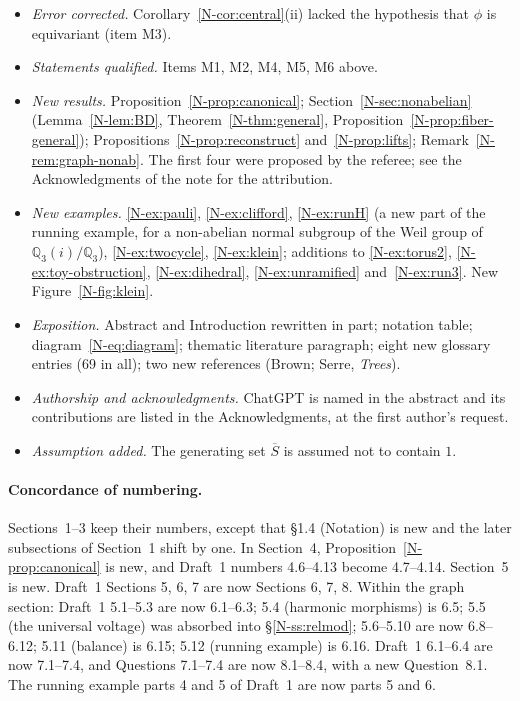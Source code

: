 \documentclass[12pt,letterpaper]{article}
\begin{document}
\begin{itemize}[itemsep=1pt]
\item \emph{Error corrected.} Corollary~\ref{N-cor:central}(ii) lacked
  the hypothesis that $\phi$ is equivariant (item M3).
\item \emph{Statements qualified.} Items M1, M2, M4, M5, M6 above.
\item \emph{New results.} Proposition~\ref{N-prop:canonical};
  Section~\ref{N-sec:nonabelian} (Lemma~\ref{N-lem:BD},
  Theorem~\ref{N-thm:general},
  Proposition~\ref{N-prop:fiber-general});
  Propositions~\ref{N-prop:reconstruct} and~\ref{N-prop:lifts};
  Remark~\ref{N-rem:graph-nonab}. The first four were proposed by the
  referee; see the Acknowledgments of the note for the attribution.
\item \emph{New examples.} \ref{N-ex:pauli}, \ref{N-ex:clifford},
  \ref{N-ex:runH} (a new part of the running example, for a non-abelian
  normal subgroup of the Weil group of $\mathbb{Q}_3(i)/\mathbb{Q}_3$),
  \ref{N-ex:twocycle}, \ref{N-ex:klein}; additions to
  \ref{N-ex:torus2}, \ref{N-ex:toy-obstruction}, \ref{N-ex:dihedral},
  \ref{N-ex:unramified} and~\ref{N-ex:run3}. New Figure~\ref{N-fig:klein}.
\item \emph{Exposition.} Abstract and Introduction rewritten in part;
  notation table; diagram~\eqref{N-eq:diagram}; thematic literature
  paragraph; eight new glossary entries (69 in all); two new references
  (Brown; Serre, \emph{Trees}).
\item \emph{Authorship and acknowledgments.} ChatGPT is named in the
  abstract and its contributions are listed in the Acknowledgments, at the
  first author's request.
\item \emph{Assumption added.} The generating set $\overline{S}$ is
  assumed not to contain $1$.
\end{itemize}

\paragraph{Concordance of numbering.} Sections~1--3 keep their numbers,
except that \S1.4 (Notation) is new and the later subsections of
Section~1 shift by one. In Section~4, Proposition~\ref{N-prop:canonical}
is new, and Draft~1 numbers 4.6--4.13 become 4.7--4.14. Section~5 is new.
Draft~1 Sections 5, 6, 7 are now Sections 6, 7, 8. Within the graph
section: Draft~1 5.1--5.3 are now 6.1--6.3; 5.4 (harmonic morphisms) is
6.5; 5.5 (the universal voltage) was absorbed into \S\ref{N-ss:relmod};
5.6--5.10 are now 6.8--6.12; 5.11 (balance) is 6.15; 5.12 (running
example) is 6.16. Draft~1 6.1--6.4 are now 7.1--7.4, and Questions
7.1--7.4 are now 8.1--8.4, with a new Question~8.1. The running example
parts 4 and 5 of Draft~1 are now parts 5 and 6.
\end{document}
